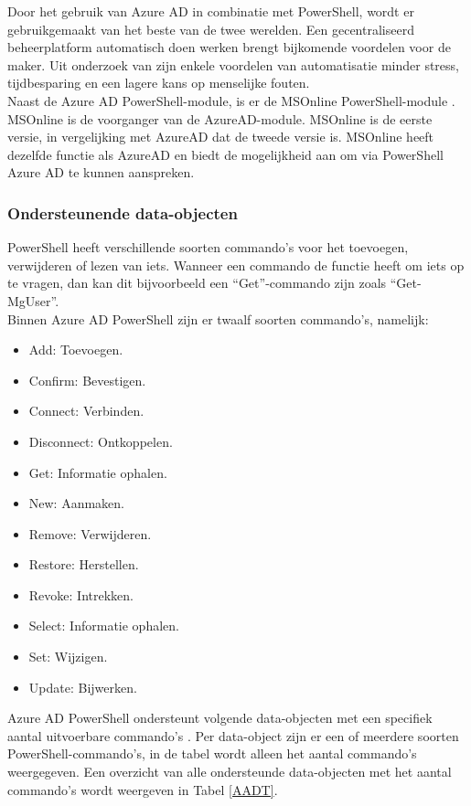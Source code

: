 Door het gebruik van Azure \ac{AD} in combinatie met PowerShell, wordt er gebruikgemaakt van het beste van de twee werelden. Een gecentraliseerd beheerplatform automatisch doen werken brengt bijkomende voordelen voor de maker. Uit onderzoek van \textcite{Breton2003} zijn enkele voordelen van automatisatie minder stress, tijdbesparing en een lagere kans op menselijke fouten. \\

Naast de Azure \ac{AD} PowerShell-module, is er de MSOnline PowerShell-module \autocite{Prigent2019}. MSOnline is de voorganger van de AzureAD-module. MSOnline is de eerste versie, in vergelijking met AzureAD dat de tweede versie is. MSOnline heeft dezelfde functie als AzureAD en biedt de mogelijkheid aan om via PowerShell Azure \ac{AD} te kunnen aanspreken.

\subsubsection{Ondersteunende data-objecten}

PowerShell heeft verschillende soorten commando's voor het toevoegen, verwijderen of lezen van iets. Wanneer een commando de functie heeft om iets op te vragen, dan kan dit bijvoorbeeld een “Get”-commando zijn zoals “Get-MgUser”. \\

Binnen Azure AD PowerShell zijn er twaalf soorten commando's, namelijk:

\begin{itemize}
    \item Add: Toevoegen.
    \item Confirm: Bevestigen.
    \item Connect: Verbinden.
    \item Disconnect: Ontkoppelen.
    \item Get: Informatie ophalen.
    \item New: Aanmaken.
    \item Remove: Verwijderen.
    \item Restore: Herstellen.
    \item Revoke: Intrekken.
    \item Select: Informatie ophalen.
    \item Set: Wijzigen.
    \item Update: Bijwerken.
\end{itemize}

Azure AD PowerShell ondersteunt volgende data-objecten met een specifiek aantal uitvoerbare commando's \autocite{Microsoft2023i}. Per data-object zijn er een of meerdere soorten PowerShell-commando's, in de tabel wordt alleen het aantal commando's weergegeven. Een overzicht van alle ondersteunde data-objecten met het aantal commando's wordt weergeven in Tabel \ref{AADT}. 

